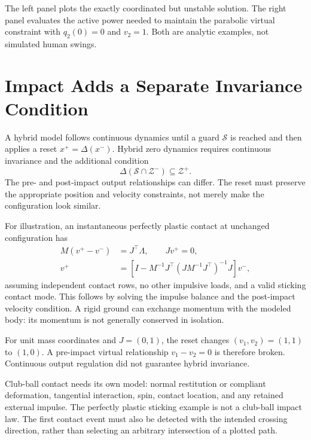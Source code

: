 The left panel plots the exactly coordinated but unstable solution. The right panel evaluates the active power needed to maintain the parabolic virtual constraint with $q_2(0)=0$ and $v_2=1$. Both are analytic examples, not simulated human swings.

\section{Impact Adds a Separate Invariance Condition}

A hybrid model follows continuous dynamics until a guard $\mathcal S$ is reached and then applies a reset $x^+=\Delta(x^-)$. Hybrid zero dynamics requires continuous invariance and the additional condition
\begin{equation}
\Delta(\mathcal S\cap\mathcal Z^-)\subseteq\mathcal Z^+ .
\end{equation}
The pre- and post-impact output relationships can differ. The reset must preserve the appropriate position and velocity constraints, not merely make the configuration look similar.

For illustration, an instantaneous perfectly plastic contact at unchanged configuration has
\begin{equation}
\begin{aligned}
M(v^+-v^-)&=J^\top\Lambda,\qquad Jv^+=0,\\
v^+&=\left[I-M^{-1}J^\top(JM^{-1}J^\top)^{-1}J\right]v^- ,
\end{aligned}
\end{equation}
assuming independent contact rows, no other impulsive loads, and a valid sticking contact mode. This follows by solving the impulse balance and the post-impact velocity condition. A rigid ground can exchange momentum with the modeled body: its momentum is not generally conserved in isolation.

For unit mass coordinates and $J=(0,1)$, the reset changes $(v_1,v_2)=(1,1)$ to $(1,0)$. A pre-impact virtual relationship $v_1-v_2=0$ is therefore broken. Continuous output regulation did not guarantee hybrid invariance.

Club-ball contact needs its own model: normal restitution or compliant deformation, tangential interaction, spin, contact location, and any retained external impulse. The perfectly plastic sticking example is not a club-ball impact law. The first contact event must also be detected with the intended crossing direction, rather than selecting an arbitrary intersection of a plotted path.

